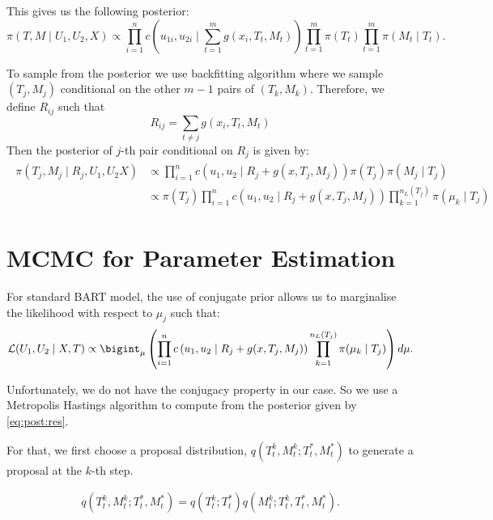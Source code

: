 \documentclass{amsart}
\begin{document}
This gives us the following posterior:
\begin{equation}
	\pi(T,M \mid U_1, U_2, X) \propto \prod_{i=1}^{n}c\left(u_{1i},u_{2i}\mid \sum_{t=1}^m g(x_i, T_t, M_t)\right)\prod_{t=1}^{m}\pi(T_t)\prod_{t=1}^{m}\pi(M_t\mid T_t).
\end{equation}

To sample from the posterior we use backfitting algorithm where we sample $(T_j, M_j)$ conditional on the other $m-1$ pairs of $(T_k,M_k)$. Therefore, we define $R_{ij}$ such that
\begin{equation*}
	R_{ij} = \sum_{t\not=j}g(x_i, T_t, M_t)
\end{equation*}
Then the posterior of $j$-th pair conditional on $R_j$ is given by:
\begin{align}\label{eq:post:res}
	\begin{split}
	    \pi(T_j,M_j \mid R_j, U_1,U_2 X) &\propto \prod_{i=1}^{n}c\left(u_{1},u_{2}\mid R_j+g(x, T_j, M_j)\right)\pi(T_j)\pi(M_j\mid T_j)\\
	&\propto \pi(T_j)\prod_{i=1}^{n}c\left(u_{1},u_{2}\mid R_j+g(x, T_j, M_j)\right)\prod_{k=1}^{n_L(T_j)}\pi(\mu_k\mid T_j)
	\end{split}
\end{align}

\section{MCMC for Parameter Estimation}
For standard BART model, the use of conjugate prior allows us to marginalise the likelihood with respect to $\mu_j$ such that:
\begin{equation}
	\mathcal{L}(U_1,U_2\mid X, T)\propto \bigint_{\mu}\left(\prod_{i=1}^{n}c\left(u_{1},u_{2}\mid R_j+g(x, T_j, M_j)\right)\prod_{k=1}^{n_L(T_j)}\pi(\mu_k\mid T_j)\right)d\mu.
\end{equation}

Unfortunately, we do not have the conjugacy property in our case. So we use a Metropolis Hastings algorithm to compute from the posterior given by \cref{eq:post:res}.

For that, we first choose a proposal distribution, $q\left(T_t^k,M_t^k;T_t^\ast, M_t^\ast\right)$ to generate a proposal at the $k$-th step.

\begin{align}\label{eq:prop}
	q\left(T_t^k,M_t^k;T_t^\ast, M_t^\ast\right) = q\left(T_t^k;T_t^\ast\right) q\left(M_t^k;T_t^k, T_t^\ast, M_t^\ast\right).
\end{align}
\end{document}
